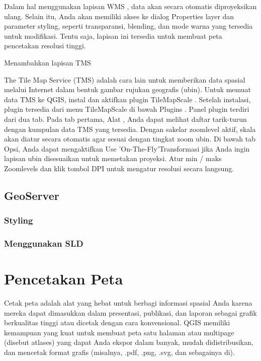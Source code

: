 \documentclass[]{book}
\begin{document}
Dalam hal menggunakan lapisan WMS , data akan secara otomatis diproyeksikan ulang. Selain itu, Anda akan memiliki akses ke dialog Properties layer dan parameter styling, seperti transparansi, blending, dan mode warna yang tersedia untuk modifikasi. Tentu saja, lapisan ini tersedia untuk membuat peta pencetakan resolusi tinggi.

Menambahkan lapisan TMS

The Tile Map Service (TMS) adalah cara lain untuk memberikan data spasial melalui Internet dalam bentuk gambar rujukan geografis (ubin). Untuk memuat data TMS ke QGIS, instal dan aktifkan plugin TileMapScale . Setelah instalasi, plugin tersedia dari menu TileMapScale di bawah Plugins . Panel plugin terdiri dari dua tab. Pada tab pertama, Alat , Anda dapat melihat daftar tarik-turun dengan kumpulan data TMS yang tersedia. Dengan sakelar zoomlevel aktif, skala akan diatur secara otomatis agar sesuai dengan tingkat zoom ubin. Di bawah tab Opsi, Anda dapat mengaktifkan Use 'On-The-Fly'Transformasi jika Anda ingin lapisan ubin disesuaikan untuk memetakan proyeksi. Atur min / maks Zoomlevels dan klik tombol DPI untuk mengatur resolusi secara langsung.

\hypertarget{geoserver-2}{%
\section{GeoServer}\label{geoserver-2}}

\hypertarget{styling-1}{%
\subsection{Styling}\label{styling-1}}

\hypertarget{menggunakan-sld}{%
\subsection{Menggunakan SLD}\label{menggunakan-sld}}

\hypertarget{pencetakan-peta}{%
\chapter{Pencetakan Peta}\label{pencetakan-peta}}

Cetak peta adalah alat yang hebat untuk berbagi informasi spasial Anda karena mereka dapat dimasukkan dalam presentasi, publikasi, dan laporan sebagai grafik berkualitas tinggi atau dicetak dengan cara konvensional. QGIS memiliki kemampuan yang kuat untuk membuat peta satu halaman atau multipage (disebut atlases) yang dapat Anda ekspor dalam banyak, mudah didistribusikan, dan mencetak format grafis (misalnya, .pdf, .png, .svg, dan sebagainya di).
\end{document}
